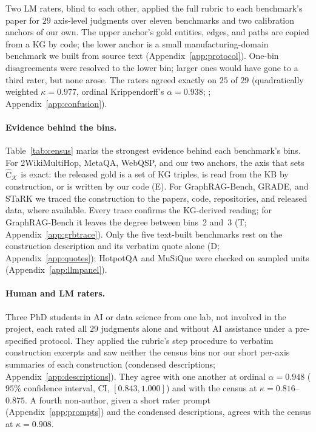\documentclass[11pt]{article}
\newcommand{\Chat}{\widehat{\mathrm{C}}}
\newcommand{\kg}{\mathcal{K}}
\begin{document}
Two LM raters, blind to each other, applied the full rubric to each benchmark's paper for $29$ axis-level judgments over eleven benchmarks and two calibration anchors of our own. The upper anchor's gold entities, edges, and paths are copied from a KG by code; the lower anchor is a small manufacturing-domain benchmark we built from source text (Appendix~\ref{app:protocol}). One-bin disagreements were resolved to the lower bin; larger ones would have gone to a third rater, but none arose. The raters agreed exactly on $25$ of $29$ (quadratically weighted $\kappa=0.977$, ordinal Krippendorff's $\alpha=0.938$; \citealp{krippendorff2004}; Appendix~\ref{app:confusion}).

\paragraph{Evidence behind the bins.} Table~\ref{tab:census} marks the strongest evidence behind each benchmark's bins. For 2WikiMultiHop, MetaQA, WebQSP, and our two anchors, the axis that sets $\Chat_{\kg}$ is exact: the released gold is a set of KG triples, is read from the KB by construction, or is written by our code (E). For GraphRAG-Bench, GRADE, and STaRK we traced the construction to the papers, code, repositories, and released data, where available. Every trace confirms the KG-derived reading; for GraphRAG-Bench it leaves the degree between bins~2 and~3 (T; Appendix~\ref{app:grbtrace}). Only the five text-built benchmarks rest on the construction description and its verbatim quote alone (D; Appendix~\ref{app:quotes}); HotpotQA and MuSiQue were checked on sampled units (Appendix~\ref{app:llmpanel}).

\paragraph{Human and LM raters.} Three PhD students in AI or data science from one lab, not involved in the project, each rated all $29$ judgments alone and without AI assistance under a pre-specified protocol. They applied the rubric's step procedure to verbatim construction excerpts and saw neither the census bins nor our short per-axis summaries of each construction (condensed descriptions; Appendix~\ref{app:descriptions}). They agree with one another at ordinal $\alpha=0.948$ ($95\%$ confidence interval, CI, $[0.843,1.000]$) and with the census at $\kappa=0.816$--$0.875$. A fourth non-author, given a short rater prompt (Appendix~\ref{app:prompts}) and the condensed descriptions, agrees with the census at $\kappa=0.908$.
\end{document}
